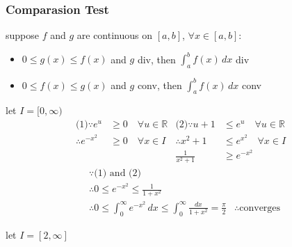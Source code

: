 		\subsubsection{Comparasion Test}
			\begin{theorem}
				suppose $f$ and $g$ are continuous on $[a,b]$, $\forall x\in[a,b]$:
				\begin{itemize}
					\item $0\le g(x)\le f(x)$ and $g$ div, then $\displaystyle\int_a^bf(x)\,dx$ div
					\item $0\le f(x)\le g(x)$ and $g$ conv, then $\displaystyle\int_a^bf(x)\,dx$ conv
				\end{itemize}
			\end{theorem}
			\begin{example}
				let $I=[0,\infty)$
				\begin{align*}
					\text{(1)}\because e^u&\ge0\quad\forall u\in\mathbb{R}&\text{(2)}\because u+1&\le e^u\quad\forall u\in\mathbb{R}\\
					\therefore e^{-x^2}&\ge0\quad\forall x\in I&\therefore x^2+1&\le e^{x^2}\quad\forall x\in I\\
				   &&\frac1{x^2+1}&\ge e^{-x^2}
				\end{align*}
				\begin{align*}
					&\because\text{(1) and (2)}\\
					&\therefore0\le e^{-x^2}\le\frac1{1+x^2}\\
					&\therefore0\le\int_0^\infty{e^{-x^2}}\,dx\le\int_0^\infty\frac{dx}{1+x^2}=\frac\pi2
					&\therefore\text{converges}
				\end{align*}
			\end{example}
			\begin{example}
				let $I=[2,\infty]$
			\end{example}
